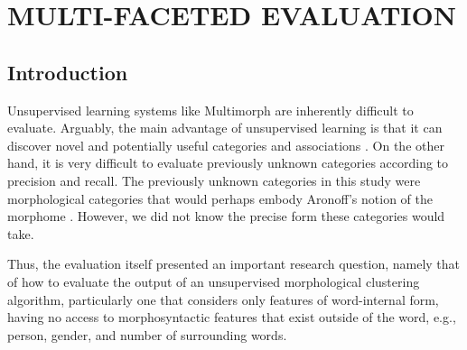 \chapter{MULTI-FACETED EVALUATION}
\label{ch:eval}

\section{Introduction}

Unsupervised learning systems like Multimorph are inherently difficult to evaluate. 
Arguably, the main advantage of unsupervised learning is that it can discover novel and potentially useful categories and associations \citep{parsons:2004}. 
On the other hand, it is very difficult to evaluate previously unknown 
categories according to precision and recall. %
The previously unknown categories in this study were morphological 
categories that would perhaps embody Aronoff's notion of the morphome \citep{aronoff:1994}.  
However, we did not know the precise form these categories would take. 



Thus, the evaluation itself presented an important research question, namely that 
of how to evaluate the output of an unsupervised morphological clustering algorithm, 
particularly one that considers only features of word-internal form, having no 
access to morphosyntactic features that exist outside of the word, e.g., person, gender, and 
number of surrounding words.

